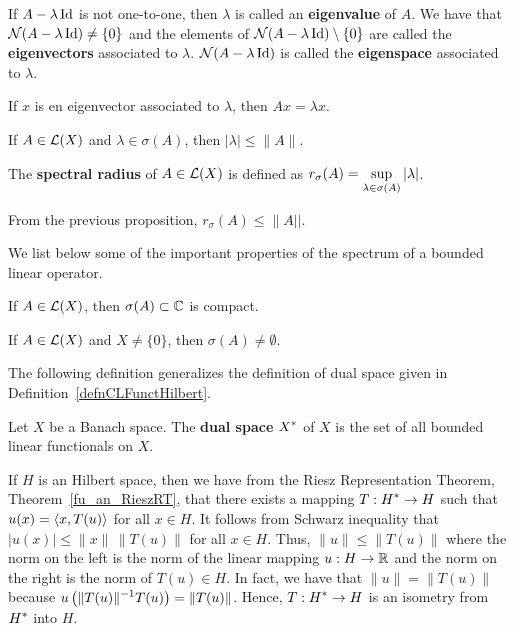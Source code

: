 \begin{defn}
If $A-\lambda \operatorname{Id}$ is not one-to-one, then $\lambda$ is called an
{\bfseries eigenvalue} of $A$.  We have that
$\mathcal{N}(A-\lambda\operatorname{Id}) \neq \{0\}$ and the elements of 
$\mathcal{N}(A-\lambda\operatorname{Id}) \setminus \{0\}$ are called the
{\bfseries eigenvectors} associated
to $\lambda$.  $\mathcal{N}(A-\lambda\operatorname{Id})$
is called the {\bfseries eigenspace}
associated to $\lambda$.
\end{defn}

If $x$ is en eigenvector associated to $\lambda$, then
$Ax = \lambda x$.

\begin{prop}
If $A \in \mathcal{L}(X)$ and $\lambda \in \sigma(A)$, then $|\lambda|\leq \|A\|$.
\end{prop}

\begin{defn}
The {\bfseries spectral radius}
of $A\in \mathcal{L}(X)$ is defined as
$\displaystyle r_\sigma(A) = \sup_{\lambda\in \sigma(A)} |\lambda|$.
\end{defn}

From the previous proposition, $r_\sigma(A) \leq \|A||$.

We list below some of the important properties of
the spectrum of a bounded linear operator.

\begin{prop}
If $A \in \mathcal{L}(X)$, then $\sigma(A) \subset \mathbb{C}$ is compact.
\end{prop}

\begin{prop}
If $A \in \mathcal{L}(X)$ and $X\neq \{0\}$, then $\sigma(A) \neq \emptyset$.
\end{prop}

The following definition generalizes the definition of dual space
given in Definition~\ref{defnCLFunctHilbert}.

\begin{defn}
Let $X$ be a Banach space.  The {\bfseries dual space}
$\displaystyle X^\ast$ of $X$ is the set of all bounded linear
functionals on $X$.
\end{defn}

\begin{egg}
If $H$ is an Hilbert space, then we have from the Riesz Representation
Theorem, Theorem~\ref{fu_an_RieszRT}, that there exists a mapping
$\displaystyle T:H^\ast \to H$ such that $u(x) = \left\langle{x} , {T(u)}\right\rangle$ for all
$x \in H$.  It follows from Schwarz inequality that
$|u(x)| \leq \|x\|\,\|T(u)\|$ for all $x \in H$.  Thus,
$\|u\| \leq \|T(u)\|$ where the norm on the left is the norm of
the linear mapping $u:H \to \mathbb{R}$ and the norm on the right is the norm
of $T(u) \in H$.  In fact, we have that $\|u\|=\|T(u)\|$ because
$\displaystyle u\left( \|T(u)\|^{-1} T(u)\right) = \|T(u)\|$.
Hence, $\displaystyle T:H^\ast \to H$ is an isometry from
$\displaystyle H^\ast$ into $H$.
\end{egg}

